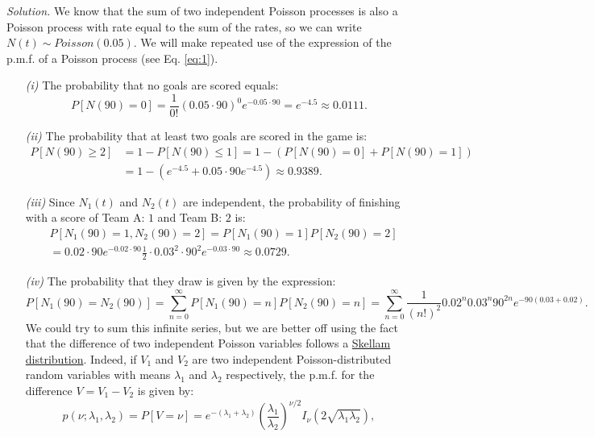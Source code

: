 \emph{Solution.} We know that the sum of two independent Poisson processes is also a Poisson process with rate equal to the sum of the rates, so we can write $N(t)\sim Poisson(0.05)$. We will make repeated use of the expression of the p.m.f. of a Poisson process (see Eq. \eqref{eq:1}).
\begin{enumerate}
  \item[\textit{(i)}] The probability that no goals are scored equals:
        \[
        P[N(90) = 0] = \frac{1}{0!}(0.05\cdot 90)^0 e^{-0.05\cdot 90} = e^{-4.5} \approx 0.0111.
        \]
  \item[\textit{(ii)}] The probability that at least two goals are scored in the game is:
        \[
        \begin{aligned}
          P[N(90) \geq 2] &= 1 - P[N(90)\leq 1] = 1 - \left( P[N(90)=0]+P[N(90)=1]\right)\\
          &= 1 - (e^{-4.5} + 0.05 \cdot 90 e^{-4.5}) \approx 0.9389.
        \end{aligned}
        \]
  \item[\textit{(iii)}] Since $N_1(t)$ and $N_2(t)$ are independent, the probability of finishing with a score of Team A: $1$ and Team B: $2$ is:
        \[
        \begin{aligned}
        &P[N_1(90)=1, N_2(90)=2] = P[N_{1}(90) = 1]P[N_{2}(90) = 2]\\
        &= 0.02\cdot 90e^{-0.02 \cdot 90} \frac{1}{2}\cdot 0.03^{2}\cdot 90^{2}e^{-0.03\cdot90} \approx 0.0729.
      \end{aligned}
        \]
  \item[\textit{(iv)}] The probability that they draw is given by the expression:
        \[
        P[N_1(90) = N_2(90)] = \sum_{n=0}^{\infty} P[N_{1}(90) = n]P[N_{2}(90) = n] = \sum_{n=0}^{\infty}\frac{1}{(n!)^{2}}0.02^{n}0.03^{n}90^{2n}e^{-90(0.03 + 0.02)}.
        \]
        We could try to sum this infinite series, but we are better off using the fact that the difference of two independent Poisson variables follows a \href{https://en.wikipedia.org/wiki/Skellam_distribution}{Skellam distribution}. Indeed, if $V_1$ and $V_2$ are two independent Poisson-distributed random variables with means $\lambda_1$ and $\lambda_2$ respectively, the p.m.f. for the difference $V=V_1-V_2$ is given by:
        \begin{equation}\label{eq:skellam}
        p(\nu; \lambda_1, \lambda_2) = P[V=\nu]=e^{-(\lambda_1+\lambda_2)}\left(\frac{\lambda_1}{\lambda_2}\right)^{\nu/2}I_{\nu}(2\sqrt{\lambda_1\lambda_2}),
      \end{equation}

\end{enumerate}
